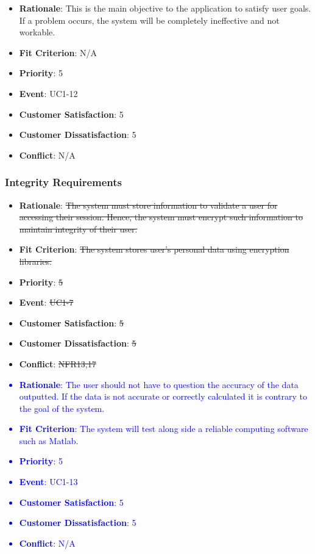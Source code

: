 \documentclass[12pt, titlepage]{article}
\newcounter{reqnum} %
\newcounter{freqnum} %
\begin{document}
\begin{itemize}
{\begin{itemize}
    \item \textbf{Rationale}: This is the main objective to the application to satisfy user goals. If a problem occurs, the system will be completely ineffective and not workable. 
    \item \textbf{Fit Criterion}: N/A
    \item \textbf{Priority}: 5
    \item \textbf{Event}: UC1-12%
    \item \textbf{Customer Satisfaction}: 5
    \item \textbf{Customer Dissatisfaction}: 5
    \item \textbf{Conflict}: N/A
\end{itemize}
}

\subsubsection{Integrity Requirements}
\item[\sout{NFR19}
\label{NFR}:] 
\begin{itemize}
    \item \textbf{Rationale}: \sout{The system must store information to validate a user for accessing their session. Hence, the system must encrypt such information to maintain integrity of their user.}
    \item \textbf{Fit Criterion}: \sout{The system stores user's personal data using encryption libraries.}
    \item \textbf{Priority}: \sout{5}
    \item \textbf{Event}: \sout{UC1-7}%
    \item \textbf{Customer Satisfaction}: \sout{5}
    \item \textbf{Customer Dissatisfaction}: \sout{5}
    \item \textbf{Conflict}: \sout{NFR13,17}
\end{itemize}
\textcolor{blue}{
\item[NFR\refstepcounter{freqnum}\thefreqnum
\label{NFR}:] 
\begin{itemize}
    \item \textbf{Rationale}: The user should not have to question the accuracy of the data outputted. If the data is not accurate or correctly calculated it is contrary to the goal of the system.
    \item \textbf{Fit Criterion}: The system will test along side a reliable computing software such as Matlab. 
    \item \textbf{Priority}: 5
    \item \textbf{Event}: UC1-13%
    \item \textbf{Customer Satisfaction}: 5
    \item \textbf{Customer Dissatisfaction}: 5
    \item \textbf{Conflict}: N/A
\end{itemize}
}


\end{itemize}
\end{document}
